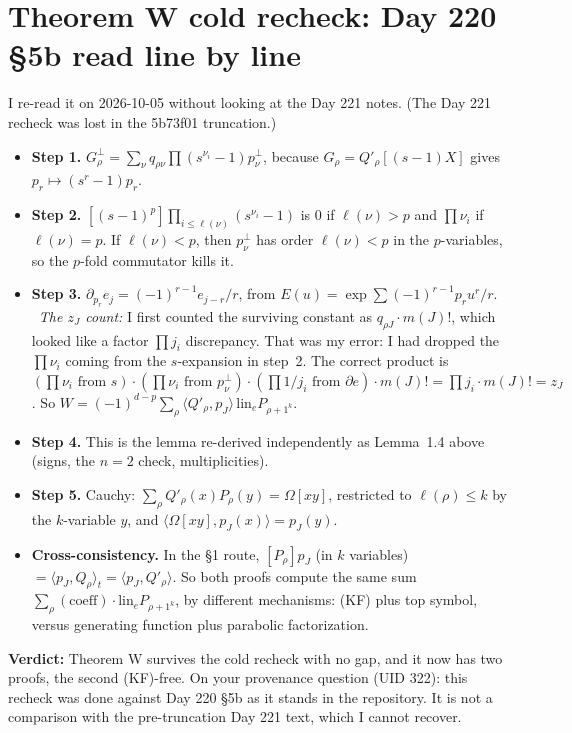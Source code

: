 \documentclass[10pt]{article}
\newcommand{\lin}{\mathrm{lin}_e}
\begin{document}
\section{Theorem W cold recheck: Day 220 \S5b read line by line}
I re-read it on 2026-10-05 without looking at the Day 221 notes. (The Day 221 recheck was lost in the 5b73f01
truncation.)
\begin{itemize}
\item \textbf{Step 1.} $G_\rho^\perp=\sum_\nu q_{\rho\nu}\prod(s^{\nu_i}-1)p_\nu^\perp$, because
  $G_\rho=Q'_\rho[(s-1)X]$ gives $p_r\mapsto(s^r-1)p_r$. \checkmark
\item \textbf{Step 2.} $[(s-1)^p]\prod_{i\le\ell(\nu)}(s^{\nu_i}-1)$ is $0$ if $\ell(\nu)>p$ and $\prod\nu_i$ if
  $\ell(\nu)=p$. If $\ell(\nu)<p$, then $p_\nu^\perp$ has order $\ell(\nu)<p$ in the $p$-variables, so the $p$-fold
  commutator kills it. \checkmark
\item \textbf{Step 3.} $\partial_{p_r}e_j=(-1)^{r-1}e_{j-r}/r$, from $E(u)=\exp\sum(-1)^{r-1}p_ru^r/r$. \checkmark\
  \emph{The $z_J$ count:} I first counted the surviving constant as $q_{\rho J}\cdot m(J)!$, which looked like a factor
  $\prod j_i$ discrepancy. That was my error: I had dropped the $\prod\nu_i$ coming from the $s$-expansion in step~2.
  The correct product is $(\prod\nu_i\text{ from }s)\cdot(\prod\nu_i\text{ from }p_\nu^\perp)\cdot(\prod 1/j_i\text{ from }\partial e)\cdot m(J)!
  =\prod j_i\cdot m(J)!=z_J$. So $W=(-1)^{d-p}\sum_\rho\langle Q'_\rho,p_J\rangle\,\lin P_{\rho+1^k}$. \checkmark
\item \textbf{Step 4.} This is the lemma re-derived independently as Lemma~1.4 above (signs, the $n=2$ check,
  multiplicities). \checkmark
\item \textbf{Step 5.} Cauchy: $\sum_\rho Q'_\rho(x)P_\rho(y)=\Omega[xy]$, restricted to $\ell(\rho)\le k$ by the
  $k$-variable $y$, and $\langle\Omega[xy],p_J(x)\rangle=p_J(y)$. \checkmark
\item \textbf{Cross-consistency.} In the \S1 route, $[P_\rho]p_J$ (in $k$ variables) $=\langle p_J,Q_\rho\rangle_t=\langle p_J,Q'_\rho\rangle$.
  So both proofs compute the same sum $\sum_\rho(\text{coeff})\cdot\lin P_{\rho+1^k}$, by different mechanisms: (KF)
  plus top symbol, versus generating function plus parabolic factorization.
\end{itemize}
\textbf{Verdict:} Theorem W survives the cold recheck with no gap, and it now has two proofs, the second (KF)-free. On
your provenance question (UID 322): this recheck was done against Day 220 \S5b as it stands in the repository. It is
not a comparison with the pre-truncation Day 221 text, which I cannot recover.
\end{document}
